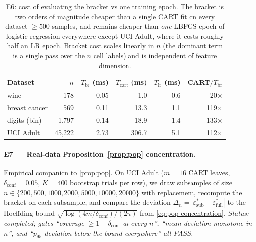 \documentclass[10pt]{article}
\theoremstyle{definition}
\theoremstyle{remark}
\newcommand{\eps}{\varepsilon}
\begin{document}
\begin{table}[h]\centering\small
\begin{tabular}{lrrrrr}
\toprule
Dataset & $n$ & $T_{\mathrm{br}}$ (ms)
        & $T_{\mathrm{cart}}$ (ms)
        & $T_{\mathrm{lr}}$ (ms)
        & CART$/T_{\mathrm{br}}$ \\
\midrule
wine          &    178 & 0.05 &   1.0 &  0.6 &  20$\times$ \\
breast cancer &    569 & 0.11 &  13.3 &  1.1 & 119$\times$ \\
digits (bin)  & 1{,}797 & 0.14 &  18.9 &  1.4 & 133$\times$ \\
UCI Adult     & 45{,}222 & 2.73 & 306.7 &  5.1 & 112$\times$ \\
\bottomrule
\end{tabular}
\caption{E6: cost of evaluating the bracket vs one training
epoch. The bracket is two orders of magnitude cheaper than a
single CART fit on every dataset $\ge 500$ samples, and remains
cheaper than \emph{one} LBFGS epoch of logistic regression
everywhere except UCI Adult, where it costs roughly half an
LR epoch. Bracket cost scales linearly in $n$ (the dominant
term is a single pass over the $n$ cell labels) and is
independent of feature dimension.}
\label{tab:e6}
\end{table}

\paragraph{E7 --- Real-data Proposition~\ref{prop:pop}
concentration.} Empirical companion to \cref{prop:pop}. On UCI
Adult ($m = 16$ CART leaves, $\delta_{\mathrm{conf}} = 0.05$,
$K = 400$ bootstrap trials per row), we draw subsamples of size
$n \in \{200, 500, 1000, 2000, 5000, 10000, 20000\}$ with
replacement, recompute the bracket on each subsample, and
compare the deviation $\Delta_{n} = |\eps^{*}_{\mathrm{sub}}
- \eps^{*}_{\mathrm{full}}|$ to the Hoeffding bound
$\sqrt{\log(4m/\delta_{\mathrm{conf}}) / (2n)}$ from
\cref{eq:pop-concentration}. \emph{Status: completed; gates
``coverage $\ge 1 - \delta_{\mathrm{conf}}$ at every $n$'',
``mean deviation monotone in $n$'', and ``$p_{95}$ deviation
below the bound everywhere'' all PASS.}
\end{document}
